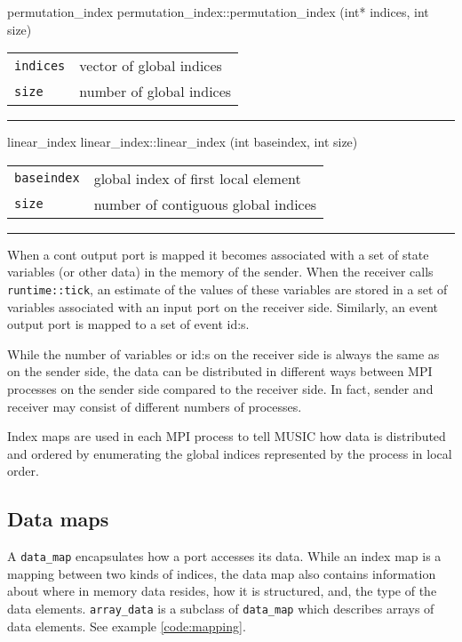 \documentclass[a4paper,twoside]{report}
\makeatletter
\newenvironment{parameters}%
{\begin{tabular}{@{\hspace{2em}}lp{0.6\textwidth}}}%
{\end{tabular}\par\vspace{1mm}\par\hrule\par\vspace{5mm}}
\makeatother
\begin{document}
\begin{head}{permutation_index}
  permutation_index::permutation_index (int* indices,
                                        int size)
\end{head}
\begin{parameters}
  \lstinline|indices| & vector of global indices \\
  \lstinline|size| & number of global indices \\
\end{parameters}

\begin{head}{linear_index}
  linear_index::linear_index (int baseindex, int size)
\end{head}
\begin{parameters}
  \lstinline|baseindex| & global index of first local element \\
  \lstinline|size| & number of contiguous global indices \\
\end{parameters}

When a cont output port is mapped it becomes associated with a set of
state variables (or other data) in the memory of the sender.  When the
receiver calls \lstinline|runtime::tick|, an estimate of the values
of these variables are stored in a set of variables associated with an
input port on the receiver side.  Similarly, an event output port is
mapped to a set of event id:s.

While the number of variables or id:s on the receiver side is always
the same as on the sender side, the data can be distributed in
different ways between MPI processes on the sender side compared to
the receiver side.  In fact, sender and receiver may consist of
different numbers of processes.

Index maps are used in each MPI process to tell MUSIC how data is
distributed and ordered by enumerating the global indices represented
by the process in local order.

\subsection{Data maps}
\label{sec:datamap}

A \lstinline|data_map| encapsulates how a port accesses its data.
While an index map is a mapping between two kinds of indices, the data
map also contains information about where in memory data resides, how
it is structured, and, the type of the data elements.
\lstinline|array_data| is a subclass of \lstinline|data_map| which
describes arrays of data elements.  See example \ref{code:mapping}.
\end{document}
